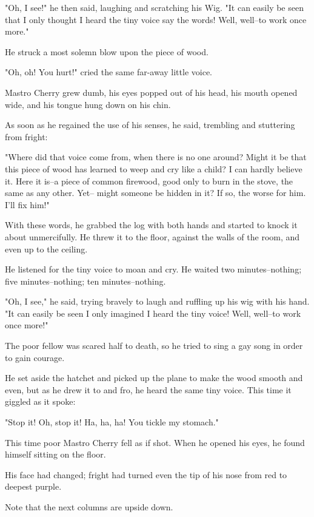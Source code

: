 \documentclass[12pt,twoside,twocolumn]{article}
\begin{document}
{  "Oh, I see!" he then said, laughing and scratching his Wig.
  "It can easily be seen that I only thought I heard the tiny
  voice say the words! Well, well--to work once more."
  
  He struck a most solemn blow upon the piece of wood.
  
  "Oh, oh!  You hurt!" cried the same far-away little voice.
  
  Mastro Cherry grew dumb, his eyes popped out of his
  head, his mouth opened wide, and his tongue hung down
  on his chin.
  
  As soon as he regained the use of his senses, he said,
  trembling and stuttering from fright:
  
  "Where did that voice come from, when there is no
  one around?  Might it be that this piece of wood has
  learned to weep and cry like a child?  I can hardly
  believe it.  Here it is--a piece of common firewood, good
  only to burn in the stove, the same as any other.  Yet--
  might someone be hidden in it?  If so, the worse for him.
  I'll fix him!"
  
  With these words, he grabbed the log with both hands
  and started to knock it about unmercifully.  He threw it
  to the floor, against the walls of the room, and even up
  to the ceiling.
  
  He listened for the tiny voice to moan and cry.
  He waited two minutes--nothing; five minutes--nothing;
  ten minutes--nothing.
  
  "Oh, I see," he said, trying bravely to laugh and
  ruffling up his wig with his hand.  "It can easily be seen
  I only imagined I heard the tiny voice!  Well, well--to
  work once more!"

  The poor fellow was scared half to death, so he tried
  to sing a gay song in order to gain courage.
  
  He set aside the hatchet and picked up the plane to
  make the wood smooth and even, but as he drew it to
  and fro, he heard the same tiny voice.  This time it giggled
  as it spoke:
  
  "Stop it!  Oh, stop it!  Ha, ha, ha! You tickle my stomach."
  
  This time poor Mastro Cherry fell as if shot.  When
  he opened his eyes, he found himself sitting on the floor.
  
  His face had changed; fright had turned even the tip of
  his nose from red to deepest purple.

}
\bigskip
Note that the next columns are upside down.
\end{document}
